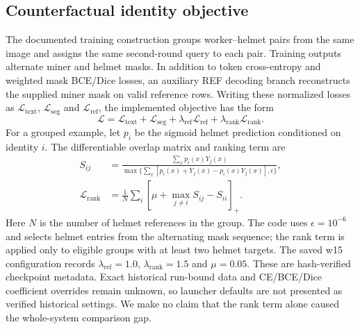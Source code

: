 \subsection{Counterfactual identity objective}
The documented training construction groups worker--helmet pairs from the
same image and assigns the same second-round query to each pair. Training
outputs alternate miner and helmet masks. In addition to token
cross-entropy and weighted mask BCE/Dice losses, an auxiliary REF decoding
branch reconstructs the supplied miner mask on valid reference rows.
Writing these normalized losses as $\mathcal L_{\mathrm{text}}$,
$\mathcal L_{\mathrm{seg}}$ and $\mathcal L_{\mathrm{ref}}$, the implemented
objective has the form
\begin{equation}
 \mathcal L=\mathcal L_{\mathrm{text}}+\mathcal L_{\mathrm{seg}}
 +\lambda_{\mathrm{ref}}\mathcal L_{\mathrm{ref}}
 +\lambda_{\mathrm{rank}}\mathcal L_{\mathrm{rank}}.
\end{equation}
For a grouped example, let $p_i$ be the sigmoid helmet prediction conditioned
on identity $i$. The differentiable overlap matrix and ranking term are
\begin{align}
 S_{ij} &= \frac{\sum_x p_i(x)Y_j(x)}
 {\max\{\sum_x[p_i(x)+Y_j(x)-p_i(x)Y_j(x)],\epsilon\}},\\
 \mathcal L_{\mathrm{rank}} &= \frac{1}{N}\sum_i
 \left[\mu+\max_{j\ne i}S_{ij}-S_{ii}\right]_+.
\end{align}
Here $N$ is the number of helmet references in the group.
The code uses $\epsilon=10^{-6}$ and selects helmet entries from the alternating
mask sequence; the rank term is applied only to eligible groups with at least
two helmet targets. The saved w15 configuration records
$\lambda_{\mathrm{ref}}=1.0$, $\lambda_{\mathrm{rank}}=1.5$ and $\mu=0.05$.
These are hash-verified checkpoint metadata. Exact historical run-bound data
and CE/BCE/Dice coefficient overrides remain unknown, so launcher defaults are
not presented as verified historical settings. We make no claim that the rank
term alone caused the whole-system comparison gap.


